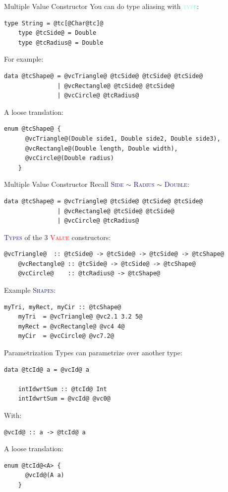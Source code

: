 \documentclass[xcolor={usenames,dvipsnames}]{beamer}
\newcommand{\hkeyword}[1]{\textcolor{Aquamarine}{\textsc{#1}}}
\newcommand{\htycon}[1]{\textcolor{MidnightBlue}{\textsc{#1}}}
\newcommand{\hvalcon}[1]{\textcolor{Red}{\textsc{#1}}}
\begin{document}
\begin{frame}[fragile]{Multiple Value Constructor}
  You can do type aliasing with \hkeyword{type}:
  \begin{lstlisting}[style=hask]
    type String = @tc[@Char@tc]@
    type @tcSide@ = Double
    type @tcRadius@ = Double
  \end{lstlisting}

  For example:
  \begin{lstlisting}[style=hask]
    data @tcShape@ = @vcTriangle@ @tcSide@ @tcSide@ @tcSide@
               | @vcRectangle@ @tcSide@ @tcSide@
               | @vcCircle@ @tcRadius@
  \end{lstlisting}

  A loose translation:
  \begin{lstlisting}[style=hask]
    enum @tcShape@ {
      @vcTriangle@(Double side1, Double side2, Double side3),
      @vcRectangle@(Double length, Double width),
      @vcCircle@(Double radius)
    }
  \end{lstlisting}
\end{frame}

\begin{frame}[fragile]{Multiple Value Constructor}
  Recall \htycon{Side} $\sim$ \htycon{Radius} $\sim$ \htycon{Double}:
  \begin{lstlisting}[style=hask]
    data @tcShape@ = @vcTriangle@ @tcSide@ @tcSide@ @tcSide@
               | @vcRectangle@ @tcSide@ @tcSide@
               | @vcCircle@ @tcRadius@
  \end{lstlisting}

  \htycon{Types} of the 3 \hvalcon{Value} constructors:
  \begin{lstlisting}[style=hask]
    @vcTriangle@  :: @tcSide@ -> @tcSide@ -> @tcSide@ -> @tcShape@
    @vcRectangle@ :: @tcSide@ -> @tcSide@ -> @tcShape@
    @vcCircle@    :: @tcRadius@ -> @tcShape@
  \end{lstlisting}

  Example \htycon{Shapes}:
  \begin{lstlisting}[style=hask]
    myTri, myRect, myCir :: @tcShape@
    myTri  = @vcTriangle@ @vc2.1 3.2 5@
    myRect = @vcRectangle@ @vc4 4@
    myCir  = @vcCircle@ @vc7.2@
  \end{lstlisting}
\end{frame}

\begin{frame}[fragile]{Parametrization}
  Types can parametrize over another type:
  \begin{lstlisting}[style=hask]
    data @tcId@ a = @vcId@ a

    intIdwrtSum :: @tcId@ Int
    intIdwrtSum = @vcId@ @vc0@
  \end{lstlisting}

  With:
  \begin{lstlisting}[style=hask]
    @vcId@ :: a -> @tcId@ a
  \end{lstlisting}

  A loose translation:
  \begin{lstlisting}[style=hask]
    enum @tcId@<A> {
      @vcId@(A a)
    }
  \end{lstlisting}
\end{frame}
\end{document}
